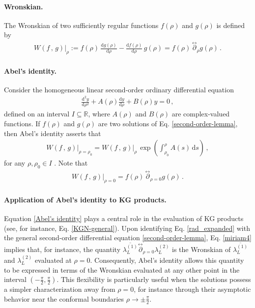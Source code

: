 \documentclass[aps,twocolumn,nofootinbib]{revtex4}
\begin{document}
{\begin{appendix}
\paragraph{Wronskian.} The Wronskian of two sufficiently regular functions $f(\rho)$ and $g(\rho)$ is defined by
\begin{align}
    W(f\,,\,g)\Big|_{\rho}:= f(\rho)\,\frac{\mathrm{d}g(\rho)}{\mathrm{d}\rho} - \frac{\mathrm{d}f(\rho)}{\mathrm{d}\rho}\,g(\rho) = f(\rho) \,\stackrel{\leftrightarrow}{\partial}_{\rho} g(\rho) \,.
\end{align}

\paragraph{Abel's identity.} Consider the homogeneous linear second-order ordinary differential equation
\begin{align} \label{second-order-lemma}
    \frac{\mathrm{d}^2 y}{\mathrm{d}\rho^2} + A(\rho)\frac{\mathrm{d}y}{\mathrm{d}\rho} + B(\rho)y = 0\,,
\end{align}
defined on an interval $I\subseteq\mathbb{R}$, where $A(\rho)$ and $B(\rho)$ are complex-valued functions. If $f(\rho)$ and $g(\rho)$ are two solutions of Eq. \eqref{second-order-lemma}, then Abel's identity asserts that
\begin{align}\label{Abel's identity}
    W(f\,,\,g)\Big|_{\rho=\rho_0} =  W(f\,,\,g)\Big|_{\rho}\, \exp\left(\int_{\rho_0}^{\rho} A(s)\,{\mathrm{d}}s \right)\,,
\end{align}
for any $\rho,\rho_0\in I$ \cite{Boyce-2021}. Note that
\begin{align}\label{miriam4}
    W(f\,,\,g)\Big|_{\rho=0} = f(\rho) \,\stackrel{\leftrightarrow}{\partial}_{\rho=0} g(\rho) \,.
\end{align}

\paragraph{Application of Abel's identity to KG products.} Equation \eqref{Abel's identity} plays a central role in the evaluation of KG products (see, for instance, Eq. \eqref{KGN-general}). Upon identifying Eq. \eqref{rad_expanded} with the general second-order differential equation \eqref{second-order-lemma}, Eq. \eqref{miriam4} implies that, for instance, the quantity $\overline{\lambda^{(1)}_L}\stackrel{\leftrightarrow}{\partial}_{\rho=0}\lambda^{(2)}_L$ is the Wronskian of $\overline{\lambda^{(1)}_L}$ and $\lambda^{(2)}_L$ evaluated at $\rho=0$. Consequently, Abel's identity allows this quantity to be expressed in terms of the Wronskian evaluated at any other point in the interval $\left(-\tfrac{\pi}{2},\tfrac{\pi}{2}\right)$. This flexibility is particularly useful when the solutions possess a simpler characterization away from $\rho=0$, for instance through their asymptotic behavior near the conformal boundaries $\rho\longrightarrow\pm\tfrac{\pi}{2}$.



\end{appendix}}
\end{document}
